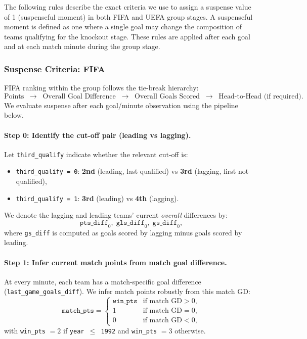 \documentclass[11pt]{article}
\begin{document}
The following rules describe the exact criteria we use to assign a suspense value of 1 (suspenseful moment) in both FIFA and UEFA group stages. A suspenseful moment is defined as one where a single goal may change the composition of teams qualifying for the knockout stage. These rules are applied after each goal and at each match minute during the group stage.

\subsubsection*{Suspense Criteria: FIFA}
\label{sec:suspense-fifa-implemented}

FIFA ranking within the group follows the tie-break hierarchy:
\[
\text{Points} \;\; \rightarrow \;\; \text{Overall Goal Difference} \;\; \rightarrow \;\; \text{Overall Goals Scored} \;\; \rightarrow \;\; \text{Head-to-Head (if required)}.
\]
We evaluate suspense after each goal/minute observation using the pipeline below.

\paragraph{Step 0: Identify the cut-off pair (leading vs lagging).}
Let \texttt{third\_qualify} indicate whether the relevant cut-off is:
\begin{itemize}
    \item \texttt{third\_qualify = 0}: \textbf{2nd} (leading, last qualified) vs \textbf{3rd} (lagging, first not qualified),
    \item \texttt{third\_qualify = 1}: \textbf{3rd} (leading) vs \textbf{4th} (lagging).
\end{itemize}
We denote the lagging and leading teams’ current \emph{overall} differences by:
\[
\texttt{pts\_diff}_0,\;\texttt{gls\_diff}_0,\;\texttt{gs\_diff}_0,
\]
where \texttt{gs\_diff} is computed as goals scored by lagging minus goals scored by leading.

\paragraph{Step 1: Infer current match points from match goal difference.}
At every minute, each team has a match-specific goal difference (\texttt{last\_game\_goals\_diff}). 
We infer match points robustly from this match GD:
\[
\texttt{match\_pts} =
\begin{cases}
\texttt{win\_pts} & \text{if match GD} > 0,\\
1 & \text{if match GD} = 0,\\
0 & \text{if match GD} < 0,
\end{cases}
\]
with \texttt{win\_pts} $=2$ if \texttt{year $\le$ 1992} and \texttt{win\_pts} $=3$ otherwise.
\end{document}
